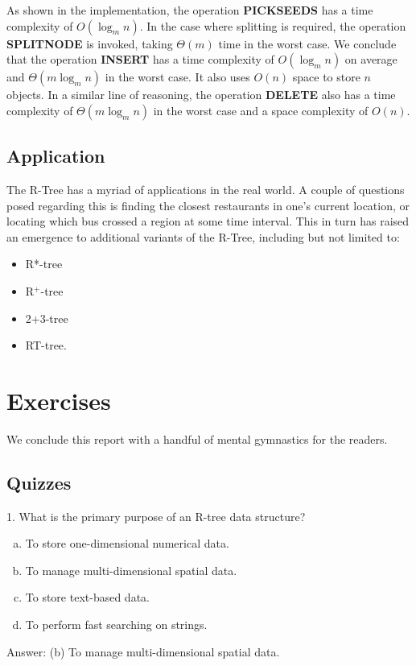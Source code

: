 \documentclass{article}
\begin{document}
As shown in the implementation, the operation \textbf{PICKSEEDS} has a time complexity of $O(\log_m n)$. In the case where splitting is required, the operation \textbf{SPLITNODE} is invoked, taking $\Theta(m)$ time in the worst case. We conclude that the operation \textbf{INSERT} has a time complexity of $O(\log_m n)$ on average and $\Theta(m\log_m n)$ in the worst case. It also uses $O(n)$ space to store $n$ objects. In a similar line of reasoning, the operation \textbf{DELETE} also has a time complexity of $\Theta(m\log_m n)$ in the worst case and a space complexity of $O(n)$.

\subsection{Application}
The R-Tree has a myriad of applications in the real world. A couple of questions posed regarding this is finding the closest restaurants in one's current location, or locating which bus crossed a region at some time interval. This in turn has raised an emergence to additional variants of the R-Tree, including but not limited to:
\begin{itemize}
	\item R*-tree
	\item R$^+$-tree
	\item 2+3-tree
	\item RT-tree.
\end{itemize}

\section{Exercises}
We conclude this report with a handful of mental gymnastics for the readers.
\subsection{Quizzes}
\begin{question}{1. What is the primary purpose of an R-tree data structure?}
	\begin{enumerate}[(a)]
		\item To store one-dimensional numerical data.
		\item To manage multi-dimensional spatial data.
		\item To store text-based data.
		\item To perform fast searching on strings.
	\end{enumerate}
\end{question}
Answer: (b) To manage multi-dimensional spatial data.
\end{document}
